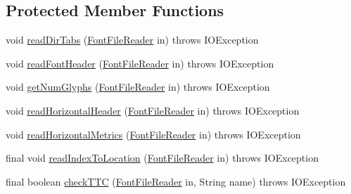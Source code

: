 \subsection*{Protected Member Functions}
\begin{DoxyCompactItemize}
\item 
void \mbox{\hyperlink{classorg_1_1newdawn_1_1slick_1_1tools_1_1hiero_1_1truetype_1_1_t_t_f_file_af88f53fa1db71b0b5c7164a23c83e485}{read\+Dir\+Tabs}} (\mbox{\hyperlink{classorg_1_1newdawn_1_1slick_1_1tools_1_1hiero_1_1truetype_1_1_font_file_reader}{Font\+File\+Reader}} in)  throws I\+O\+Exception 
\item 
void \mbox{\hyperlink{classorg_1_1newdawn_1_1slick_1_1tools_1_1hiero_1_1truetype_1_1_t_t_f_file_a86f1d9ce3f436860034ef9579235263e}{read\+Font\+Header}} (\mbox{\hyperlink{classorg_1_1newdawn_1_1slick_1_1tools_1_1hiero_1_1truetype_1_1_font_file_reader}{Font\+File\+Reader}} in)  throws I\+O\+Exception 
\item 
void \mbox{\hyperlink{classorg_1_1newdawn_1_1slick_1_1tools_1_1hiero_1_1truetype_1_1_t_t_f_file_ae81e69f9b10f90d0461b0058931d4fe5}{get\+Num\+Glyphs}} (\mbox{\hyperlink{classorg_1_1newdawn_1_1slick_1_1tools_1_1hiero_1_1truetype_1_1_font_file_reader}{Font\+File\+Reader}} in)  throws I\+O\+Exception 
\item 
void \mbox{\hyperlink{classorg_1_1newdawn_1_1slick_1_1tools_1_1hiero_1_1truetype_1_1_t_t_f_file_a4c423ea26782f345ed5d6aca86e6ab87}{read\+Horizontal\+Header}} (\mbox{\hyperlink{classorg_1_1newdawn_1_1slick_1_1tools_1_1hiero_1_1truetype_1_1_font_file_reader}{Font\+File\+Reader}} in)  throws I\+O\+Exception 
\item 
void \mbox{\hyperlink{classorg_1_1newdawn_1_1slick_1_1tools_1_1hiero_1_1truetype_1_1_t_t_f_file_aabb93fad8d1da3cda265a1191a48af28}{read\+Horizontal\+Metrics}} (\mbox{\hyperlink{classorg_1_1newdawn_1_1slick_1_1tools_1_1hiero_1_1truetype_1_1_font_file_reader}{Font\+File\+Reader}} in)  throws I\+O\+Exception 
\item 
final void \mbox{\hyperlink{classorg_1_1newdawn_1_1slick_1_1tools_1_1hiero_1_1truetype_1_1_t_t_f_file_a5913d90ca8d73a6166461ea2f76f0d68}{read\+Index\+To\+Location}} (\mbox{\hyperlink{classorg_1_1newdawn_1_1slick_1_1tools_1_1hiero_1_1truetype_1_1_font_file_reader}{Font\+File\+Reader}} in)  throws I\+O\+Exception 
\item 
final boolean \mbox{\hyperlink{classorg_1_1newdawn_1_1slick_1_1tools_1_1hiero_1_1truetype_1_1_t_t_f_file_a8854ffcced1a986071cc253031e2bcf8}{check\+T\+TC}} (\mbox{\hyperlink{classorg_1_1newdawn_1_1slick_1_1tools_1_1hiero_1_1truetype_1_1_font_file_reader}{Font\+File\+Reader}} in, String name)  throws I\+O\+Exception 
\end{DoxyCompactItemize}
